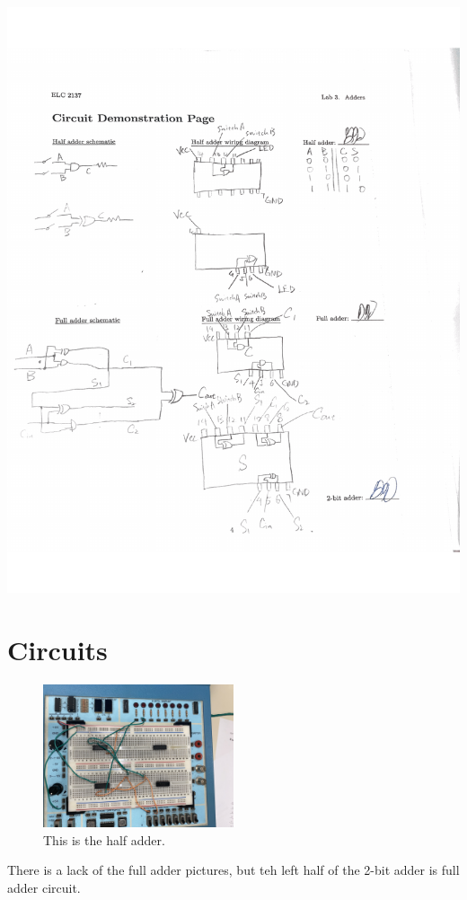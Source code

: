\documentclass[11pt]{article}
\begin{document}
\includegraphics[width=\textwidth]{"circuit demonstration page"}

\section*{Circuits}

\begin{figure}[ht]\centering
	\includegraphics[width=0.5\textwidth]{halfadder}
	\caption{This is the half adder.}
	\label{fig:half adder}			%
\end{figure}
There is a lack of the full adder pictures, but teh left half of the  2-bit adder is full adder circuit.
\end{document}
